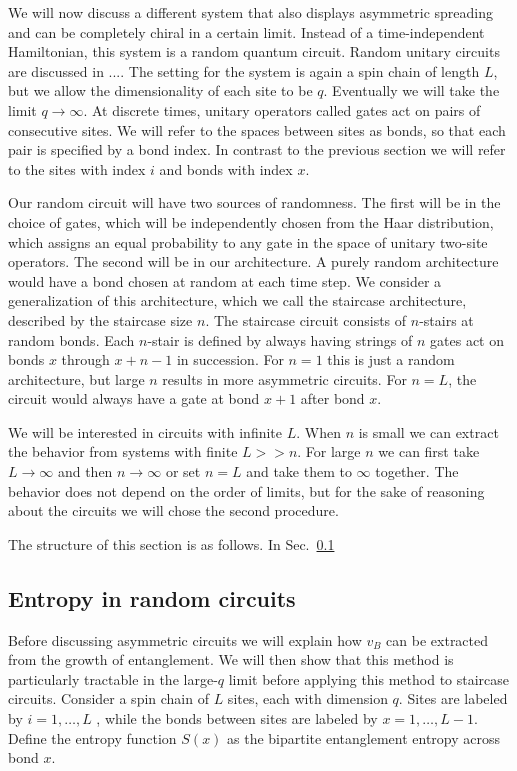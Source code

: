 \documentclass[aps,prx,reprint,superscriptaddress, longbibliography]{revtex4-1}
\begin{document}
We will now discuss a different system that also displays asymmetric spreading and can be completely chiral in a certain limit. Instead of a time-independent Hamiltonian, this system is a random quantum circuit. Random unitary circuits are discussed in .... The setting for the system is again a spin chain of length $L$, but we allow the dimensionality of each site to be $q$. Eventually we will take the limit $q\to\infty$. At discrete times, unitary operators called gates act on pairs of consecutive sites. We will refer to the spaces between sites as bonds, so that each pair is specified by a bond index. In contrast to the previous section we will refer to the sites with index $i$ and bonds with index $x$. 

Our random circuit will have two sources of randomness. The first will be in the choice of gates, which will be independently chosen from the Haar distribution, which assigns an equal probability to any gate in the space of unitary two-site operators. The second will be in our architecture. A purely random architecture would have a bond chosen at random at each time step. We consider a generalization of this architecture, which we call the staircase architecture, described by the staircase size $n$. The staircase circuit consists of $n$-stairs at random bonds. 
Each $n$-stair is defined by always having strings of $n$ gates act on bonds $x$ through $x+n-1$ in succession. For $n=1$ this is just a random architecture, but large $n$ results in more asymmetric circuits. For $n=L$, the circuit would always have a gate at bond $x+1$ after bond $x$.

We will be interested in circuits with infinite $L$. When $n$ is small we can extract the behavior from systems with finite $L>>n$. For large $n$ we can first take $L\to\infty$ and then $n\to\infty$ or set $n=L$ and take them to $\infty$ together. The behavior does not depend on the order of limits, but for the sake of reasoning about the circuits we will chose the second procedure.

The structure of this section is as follows. In Sec.~\ref{sub:entropy}

\subsection{Entropy in random circuits} \label{sub:entropy}

Before discussing asymmetric circuits we will explain how $v_B$ can be extracted from the growth of entanglement. We will then show that this method is particularly tractable in the large-$q$ limit before applying this method to staircase circuits. 
Consider a spin chain of $L$ sites, each with dimension $q$. Sites are labeled by $i = 1,\dots, L$ , while the bonds between sites are labeled by $x = 1, \dots, L - 1$. Define the entropy function $S(x)$ as the bipartite entanglement entropy across bond $x$. 
\end{document}
